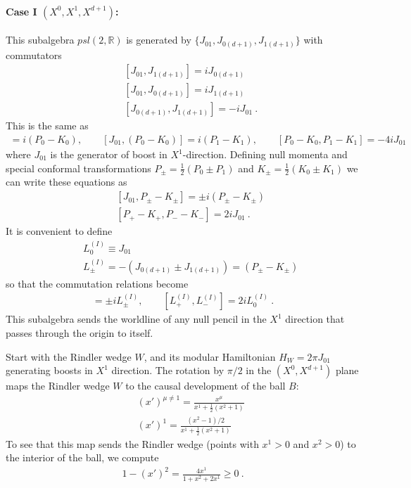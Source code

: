 \documentclass[a4paper,11pt]{article}
\theoremstyle{definition}
\newcommand{\nn}{\nonumber}
\begin{document}
\paragraph{Case I $(X^{0},X^1,X^{d+1})$:} This subalgebra $psl(2,\mathbb{R})$ is generated by $\{J_{01},J_{0(d+1)},J_{1(d+1)}\}$ with commutators 
\begin{eqnarray}
    &&[J_{01},J_{1(d+1)}]=iJ_{0(d+1)}\nn\\
    &&[J_{01},J_{0(d+1)}]=iJ_{1(d+1)}\nn\\
    &&[J_{0(d+1)},J_{1(d+1)}]=-iJ_{01}\ . 
\end{eqnarray}
This is the same as 
\begin{eqnarray}
    [J_{01},(P_1-K_1)]=i(P_0-K_0),\qquad  [J_{01},(P_0-K_0)]=i(P_1-K_1),\qquad [P_0-K_0,P_1-K_1]=-4i J_{01}
\end{eqnarray}
where $J_{01}$ is the generator of boost in $X^1$-direction. Defining null momenta and special conformal transformations $P_\pm=\frac{1}{2}(P_0\pm P_1)$ and $K_\pm=\frac{1}{2}(K_0\pm K_1)$ we can write these equations as 
\begin{eqnarray}
    &&[J_{01},P_\pm -K_\pm]=\pm i(P_\pm-K_\pm)\nn\\
    &&[P_+-K_+,P_--K_-]=2i J_{01}\ .
\end{eqnarray}
It is convenient to define 
\begin{eqnarray}
&&L_0^{(I)}\equiv J_{01}\nn\\
&&L_\pm^{(I)}=-(J_{0(d+1)}\pm J_{1(d+1)})=(P_\pm-K_\pm)
\end{eqnarray}
 so that the commutation relations become 
\begin{eqnarray}
    [L^{(I)}_0,L^{(I)}_\pm]=\pm i L^{(I)}_\pm,\qquad [L_+^{(I)},L_-^{(I)}]=2i L_0^{(I)} \ .
\end{eqnarray}
This subalgebra sends the worldline of any null pencil in the $X^1$ direction that passes through the origin to itself.

Start with the Rindler wedge $W$, and its modular Hamiltonian $H_W= 2\pi J_{01}$ generating boosts in $X^1$ direction. The rotation by $\pi/2$ in the $(X^0,X^{d+1})$ plane maps the Rindler wedge $W$ to the causal development of the ball $B$:
\begin{eqnarray}
    &&(x')^{\mu\neq 1}=\frac{x^\mu}{x^1+\frac{1}{2}(x^2+1)}\nn\\
    &&(x')^1=\frac{(x^2-1)/2}{x^1+\frac{1}{2}(x^2+1)}
\end{eqnarray}
To see that this map sends the Rindler wedge (points with $x^1>0$ and $x^2>0$) to the interior of the ball, we compute 
\begin{eqnarray}
    1-(x')^2=\frac{4x^1}{1+x^2+2x^1}\geq 0\ .
\end{eqnarray}
\end{document}

